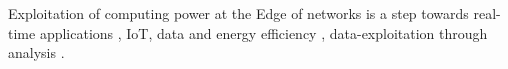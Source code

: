 \documentclass[11pt]{sdm}
\begin{document}



Exploitation of computing power at the Edge of networks is a step towards real-time applications \cite{rausch_towards_2021,lin_cloudfog_2017}, \gls{IoT}, data and energy efficiency \cite{ieee_standards_association_smart_2018}, data-exploitation through analysis \cite{openfog_consortium_real-time_2018}.
\end{document}
